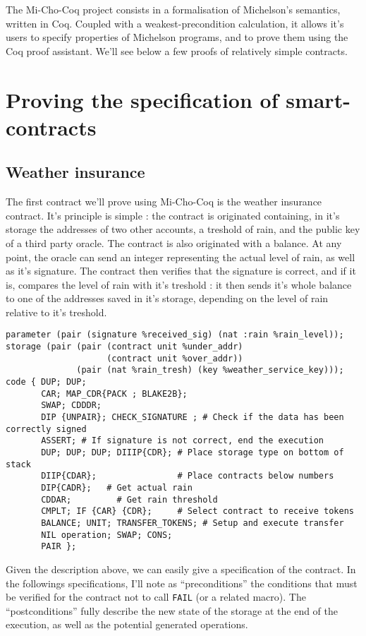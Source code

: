 \documentclass{report}
\begin{document}
The Mi-Cho-Coq project consists in a formalisation of Michelson's semantics, written in Coq. Coupled with a weakest-precondition calculation, it allows it's users to specify properties of Michelson programs, and to prove them using the Coq proof assistant. We'll see below a few proofs of relatively simple contracts.

\section{Proving the specification of smart-contracts}

\subsection{Weather insurance}
\label{contractsSpec}

The first contract we'll prove using Mi-Cho-Coq is the weather insurance contract. It's principle is simple : the contract is originated containing, in it's storage the addresses of two other accounts, a treshold of rain, and the public key of a third party oracle. The contract is also originated with a balance. At any point, the oracle can send an integer representing the actual level of rain, as well as it's signature. The contract then verifies that the signature is correct, and if it is, compares the level of rain with it's treshold : it then sends it's whole balance to one of the addresses saved in it's storage, depending on the level of rain relative to it's treshold.


\begin{lstlisting}[language=michelson]
parameter (pair (signature %received_sig) (nat :rain %rain_level));
storage (pair (pair (contract unit %under_addr)
                    (contract unit %over_addr))
              (pair (nat %rain_tresh) (key %weather_service_key)));
code { DUP; DUP;
       CAR; MAP_CDR{PACK ; BLAKE2B};
       SWAP; CDDDR;
       DIP {UNPAIR}; CHECK_SIGNATURE ; # Check if the data has been correctly signed
       ASSERT; # If signature is not correct, end the execution
       DUP; DUP; DUP; DIIIP{CDR}; # Place storage type on bottom of stack
       DIIP{CDAR};                # Place contracts below numbers
       DIP{CADR};   # Get actual rain
       CDDAR;         # Get rain threshold
       CMPLT; IF {CAR} {CDR};     # Select contract to receive tokens
       BALANCE; UNIT; TRANSFER_TOKENS; # Setup and execute transfer
       NIL operation; SWAP; CONS;
       PAIR };
\end{lstlisting}
Given the description above, we can easily give a specification of the contract. In the followings specifications, I'll note as ``preconditions'' the conditions that must be verified for the contract not to call \lstinline{FAIL} (or a related macro). The ``postconditions'' fully describe the new state of the storage at the end of the execution, as well as the potential generated operations.
\end{document}
